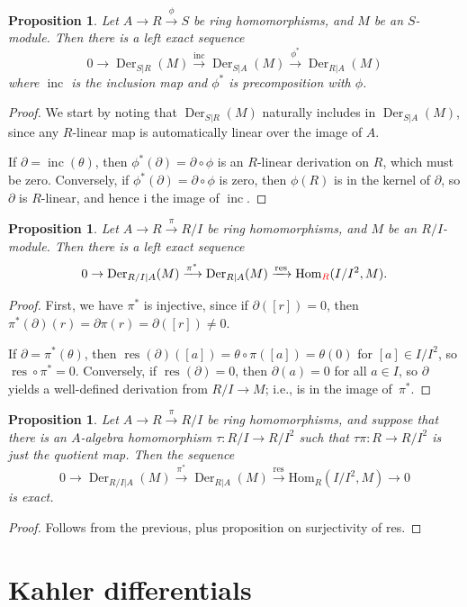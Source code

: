 \documentclass{amsart}[12pt]
\def\inc{\operatorname{inc}}
\def\Der{\operatorname{Der}}
\newcommand{\Hom}{\mathrm{Hom}}
\numberwithin{equation}{section}
\theoremstyle{plain} %
\newtheorem{prop}[equation]{Proposition}
\theoremstyle{definition}
\theoremstyle{remark}
\renewcommand{\sec}[1]{\section{#1}}
\newcommand{\xra}[1]{\xrightarrow{#1}}
\def\res{\operatorname{res}}
\newcommand{\red}[1]{{\color{red}#1}}
\begin{document}
\begin{prop} Let $A\to R \xra{\phi} S$ be ring homomorphisms, and $M$ be an $S$-module. Then there is a left exact sequence
\[ 0 \to \Der_{S|R}(M) \xra{\inc} \Der_{S|A}(M) \xra{\phi^*} \Der_{R|A}(M)\]
where $\inc$ is the inclusion map and $\phi^*$ is precomposition with $\phi$.
\end{prop}
\begin{proof}
We start by noting that $\Der_{S|R}(M)$ naturally includes in $\Der_{S|A}(M)$, since any $R$-linear map is automatically linear over the image of $A$. 

If $\partial = \inc(\theta)$, then $\phi^*(\partial) = \partial \circ\phi$ is an $R$-linear derivation on $R$, which must be zero. Conversely, if $\phi^*(\partial) =  \partial \circ\phi$ is zero, then $\phi(R)$ is in the kernel of $\partial$, so $\partial$ is $R$-linear, and hence i the image of $\inc$.
\end{proof}

\begin{prop} Let $A\to R  \xra{\pi} R/I$ be ring homomorphisms, and $M$ be an $R/I$-module. Then there is a left exact sequence
\[ 0 \to \Der_{R/I|A}(M) \xra{\pi^*} \Der_{R|A}(M) \xra{\res} \Hom_{\red{R}}(I/I^2,M). \]
\end{prop}
\begin{proof}
First, we have $\pi^*$ is injective, since if $\partial([r])=0$, then $\pi^*(\partial)(r) = \partial \pi(r) = \partial([r])\neq 0$. 

If $\partial=\pi^*(\theta)$, then $\res( \partial) ([a]) =\theta \circ \pi([a]) = \theta (0)$ for $[a]\in I/I^2$, so $\res\circ\pi^*=0$. Conversely, if $\res(\partial)=0$, then $\partial(a)=0$ for all $a\in I$, so $\partial$ yields a well-defined derivation from $R/I\to M$; i.e., is in the image of~$\pi^*$.
\end{proof}

\begin{prop} Let $A\to R  \xra{\pi} R/I$ be ring homomorphisms, and suppose that there is an $A$-algebra homomorphism $\tau:R/I \to R/I^2$ such that $\tau\pi: R\to R/I^2$ is just the quotient map. Then the sequence
\[ 0 \to \Der_{R/I|A}(M) \xra{\pi^*} \Der_{R|A}(M) \xra{\res} \Hom_{{R}}(I/I^2,M) \to 0 \]
is exact.
\end{prop}
\begin{proof}
Follows from the previous, plus proposition on surjectivity of res.
\end{proof}


\sec{Kahler differentials}
\end{document}
